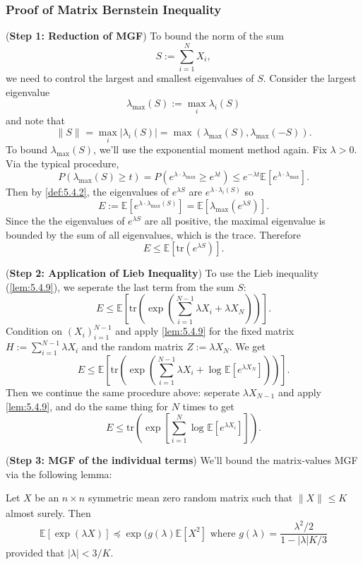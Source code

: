 \subsubsection{Proof of Matrix Bernstein Inequality}
(\textbf{Step 1: Reduction of MGF}) To bound the norm of the sum 
\[ S := \sum_{i = 1}^{N} X_i, \]
we need to control the largest and smallest eigenvalues of $S$. Consider the largest eigenvalue 
\[ \lambda_{\mathrm{max}}(S) := \max_{i} \lambda_i(S) \]
and note that 
\[ \lVert S \rVert_{} = \max_{i}|\lambda_i(S)| 
= \max_{}(\lambda_{\mathrm{max}}(S), \lambda_{\mathrm{max}}(-S)). \]
To bound $\lambda_{\mathrm{max}}(S)$, we'll use the exponential moment method again. Fix $\lambda > 0$. Via 
the typical procedure, 
\[ P(\lambda_{\mathrm{max}}(S) \geq t) 
= P(e^{\lambda \cdot \lambda_{\mathrm{max}}} \geq e^{\lambda t}) 
\leq e^{-\lambda t} \mathbb{E}[e^{\lambda \cdot \lambda_{\mathrm{max}}}]. \]
Then by \cref{def:5.4.2}, the eigenvalues of $e^{\lambda S}$ are $e^{\lambda \cdot \lambda_i(S)}$ so 
\[ E := \mathbb{E}[e^{\lambda \cdot \lambda_{\mathrm{max}}(S)}] 
= \mathbb{E}[\lambda_{\mathrm{max}}(e^{\lambda S})]. \]
Since the the eigenvalues of $e^{\lambda S}$ are all positive, the maximal eigenvalue is bounded by the sum of 
all eigenvalues, which is the trace. Therefore 
\[ E \leq \mathbb{E}[\mathrm{tr}(e^{\lambda S})]. \]

(\textbf{Step 2: Application of Lieb Inequality}) To use the Lieb inequality (\cref{lem:5.4.9}), we seperate 
the last term from the sum $S$:
\[ E \leq \mathbb{E}\left[ \mathrm{tr}\left( \exp{\left( \sum_{i = 1}^{N - 1} \lambda X_i 
+ \lambda X_N \right)} \right) \right]. \]
Condition on $(X_i)_{i = 1}^{N - 1}$ and apply \cref{lem:5.4.9} for the fixed matrix $H := \sum_{i = 1}^{N - 1} 
\lambda X_i$ and the random matrix $Z := \lambda X_N$. We get 
\[ E \leq \mathbb{E}[\mathrm{tr}(\exp{\left( \sum_{i = 1}^{N - 1} \lambda X_i 
+ \log_{}{\mathbb{E}[e^{\lambda X_N}]} \right)})]. \]
Then we continue the same procedure above: seperate $\lambda X_{N - 1}$ and apply \cref{lem:5.4.9}, and do the 
same thing for $N$ times to get 
\[ E \leq \mathrm{tr}\left( \exp{\left[ \sum_{i = 1}^{N} \log_{}{\mathbb{E}[e^{\lambda X_i}]} 
\right]} \right). \]

(\textbf{Step 3: MGF of the individual terms}) We'll bound the matrix-values MGF via the following lemma:
\begin{lemma}
\label{lem:5.4.10}
Let $X$ be an $n \times n$ symmetric mean zero random matrix such that $\lVert X \rVert_{} \leq K$ almost 
surely. Then 
\[ \mathbb{E}[\exp{(\lambda X)}] \preceq \exp{(g(\lambda)\mathbb{E}[X^2]} 
\text{ where } g(\lambda) = \frac{\lambda^2 / 2}{1 - |\lambda|K / 3} \]
provided that $|\lambda| < 3 / K$.
\end{lemma}

